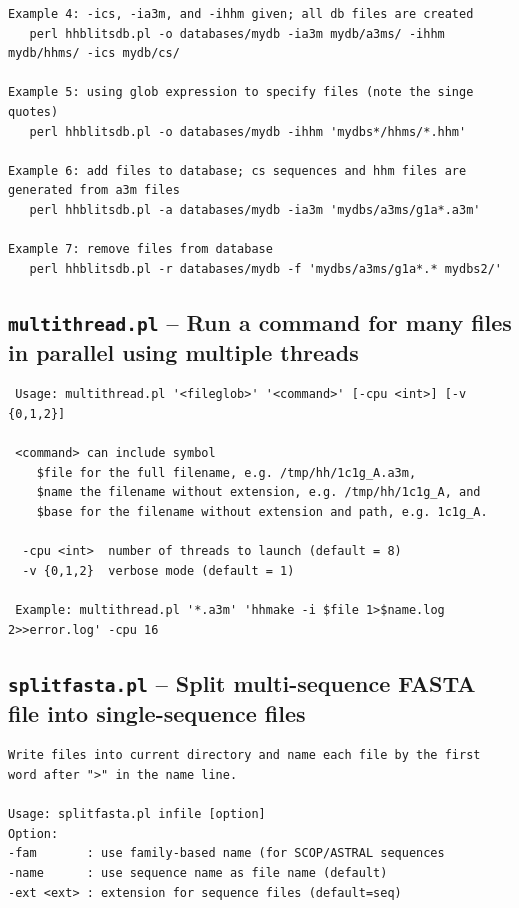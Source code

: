 \documentclass[11pt,a4paper]{article}
\begin{document}
\begin{verbatim}
Example 4: -ics, -ia3m, and -ihhm given; all db files are created 
   perl hhblitsdb.pl -o databases/mydb -ia3m mydb/a3ms/ -ihhm mydb/hhms/ -ics mydb/cs/  

Example 5: using glob expression to specify files (note the singe quotes)
   perl hhblitsdb.pl -o databases/mydb -ihhm 'mydbs*/hhms/*.hhm'  

Example 6: add files to database; cs sequences and hhm files are generated from a3m files
   perl hhblitsdb.pl -a databases/mydb -ia3m 'mydbs/a3ms/g1a*.a3m'  

Example 7: remove files from database
   perl hhblitsdb.pl -r databases/mydb -f 'mydbs/a3ms/g1a*.* mydbs2/'  
\end{verbatim} 
\normalsize

\subsection{{\tt multithread.pl} -- Run a command for many files in parallel using multiple threads}

\small 
\begin{verbatim}
 Usage: multithread.pl '<fileglob>' '<command>' [-cpu <int>] [-v {0,1,2}]

 <command> can include symbol 
    $file for the full filename, e.g. /tmp/hh/1c1g_A.a3m, 
    $name the filename without extension, e.g. /tmp/hh/1c1g_A, and 
    $base for the filename without extension and path, e.g. 1c1g_A.

  -cpu <int>  number of threads to launch (default = 8)
  -v {0,1,2}  verbose mode (default = 1)

 Example: multithread.pl '*.a3m' 'hhmake -i $file 1>$name.log 2>>error.log' -cpu 16
\end{verbatim} 
\normalsize

\subsection{{\tt splitfasta.pl} -- Split multi-sequence FASTA file into single-sequence files}
\small 
\begin{verbatim}
Write files into current directory and name each file by the first word after ">" in the name line. 

Usage: splitfasta.pl infile [option]
Option:
-fam       : use family-based name (for SCOP/ASTRAL sequences
-name      : use sequence name as file name (default)
-ext <ext> : extension for sequence files (default=seq)
\end{verbatim} 
\normalsize
\end{document}

